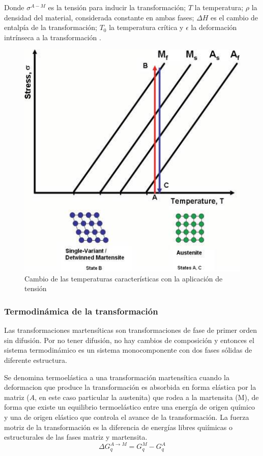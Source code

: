 \documentclass{article}
\theoremstyle{definition}
\theoremstyle{remark}
\begin{document}
Donde $\sigma^{A-M}$ es la tensión para inducir la transformación; $T$ la temperatura; $\rho$ la densidad del material, considerada constante en ambas fases; $\Delta H$ es el cambio de entalpía de la transformación; $T_0$ la temperatura crítica y $\epsilon$ la deformación intrínseca a la transformación \citep{Malvasio}.

\begin{figure}[H]
	\centering
	\includegraphics[scale=0.4]{img/StressTransformation.png}
	\caption{Cambio de las temperaturas características con la aplicación de tensión}
	\label{TvsS}
\end{figure}

\subsubsection{Termodinámica de la transformación}
Las transformaciones martensíticas son transformaciones de fase de primer orden sin difusión. Por no tener difusión, no hay cambios de composición y entonces el sistema termodinámico es un sistema monocomponente con dos fases sólidas de diferente estructura.\cite{Santamarta}

Se denomina termoelástica a una transformación martensítica cuando la deformacion que produce la transformación es absorbida en forma elástica por la matriz ($A$, en este caso particular la austenita) que rodea a la martensita (M), de forma que existe un equilibrio termoelástico entre una energía de origen químico y una de origen elástico que controla el avance de la transformación. La fuerza motriz de la transformación es la diferencia de energías libres quiímicas o estructurales de las fases matriz y martensita.
\begin{equation}
	\Delta G^{A \rightarrow M}_q = G^M_q - G^A_q
\end{equation}
\end{document}
